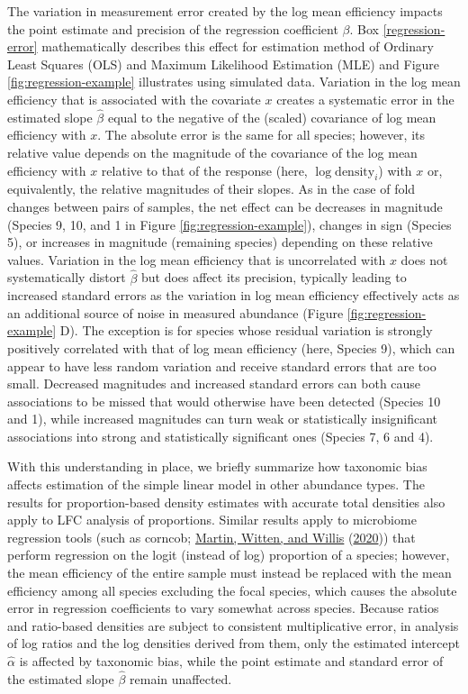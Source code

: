 \documentclass[
]{article}
\theoremstyle{definition}
\theoremstyle{definition}
\theoremstyle{definition}
\theoremstyle{definition}
\theoremstyle{remark}
\begin{document}
The variation in measurement error created by the log mean efficiency impacts the point estimate and precision of the regression coefficient \(\beta\).
Box \ref{regression-error} mathematically describes this effect for estimation method of Ordinary Least Squares (OLS) and Maximum Likelihood Estimation (MLE) and Figure \ref{fig:regression-example} illustrates using simulated data.
Variation in the log mean efficiency that is associated with the covariate \(x\) creates a systematic error in the estimated slope \(\hat \beta\) equal to the negative of the (scaled) covariance of log mean efficiency with \(x\).
The absolute error is the same for all species; however, its relative value depends on the magnitude of the covariance of the log mean efficiency with \(x\) relative to that of the response (here, \(\log \text{density}_{i}\)) with \(x\) or, equivalently, the relative magnitudes of their slopes.
As in the case of fold changes between pairs of samples, the net effect can be decreases in magnitude (Species 9, 10, and 1 in Figure \ref{fig:regression-example}), changes in sign (Species 5), or increases in magnitude (remaining species) depending on these relative values.
Variation in the log mean efficiency that is uncorrelated with \(x\) does not systematically distort \(\hat \beta\) but does affect its precision, typically leading to increased standard errors as the variation in log mean efficiency effectively acts as an additional source of noise in measured abundance (Figure \ref{fig:regression-example} D).
The exception is for species whose residual variation is strongly positively correlated with that of log mean efficiency (here, Species 9), which can appear to have less random variation and receive standard errors that are too small.
Decreased magnitudes and increased standard errors can both cause associations to be missed that would otherwise have been detected (Species 10 and 1), while increased magnitudes can turn weak or statistically insignificant associations into strong and statistically significant ones (Species 7, 6 and 4).

With this understanding in place, we briefly summarize how taxonomic bias affects estimation of the simple linear model in other abundance types.
The results for proportion-based density estimates with accurate total densities also apply to LFC analysis of proportions.
Similar results apply to microbiome regression tools (such as corncob; \protect\hyperlink{ref-martin2020mode}{Martin, Witten, and Willis} (\protect\hyperlink{ref-martin2020mode}{2020})) that perform regression on the logit (instead of log) proportion of a species; however,
the mean efficiency of the entire sample must instead be replaced with the mean efficiency among all species excluding the focal species, which causes the absolute error in regression coefficients to vary somewhat across species.
Because ratios and ratio-based densities are subject to consistent multiplicative error, in analysis of log ratios and the log densities derived from them, only the estimated intercept \(\hat \alpha\) is affected by taxonomic bias, while the point estimate and standard error of the estimated slope \(\hat \beta\) remain unaffected.
\end{document}
